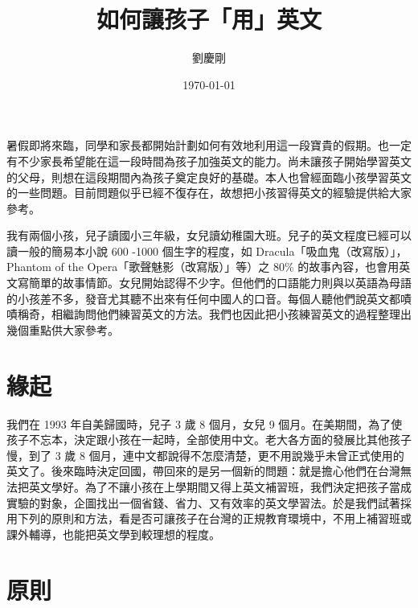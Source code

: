 
\title{ {\MB 如何讓孩子「用」英文}}	%
\author{{\SM 劉慶剛}}				%
\date{{\TT \today }} 			
 

\maketitle
\fontsize{12}{22pt}\selectfont 

暑假即將來臨，同學和家長都開始計劃如何有效地利用這一段寶貴的假期。也一定有不少家長希望能在這一段時間為孩子加強英文的能力。尚未讓孩子開始學習英文的父母，則想在這段期間內為孩子奠定良好的基礎。本人也曾經面臨小孩學習英文的一些問題。目前問題似乎已經不復存在，故想把小孩習得英文的經驗提供給大家參考。

我有兩個小孩，兒子讀國小三年級，女兒讀幼稚園大班。兒子的英文程度已經可以讀一般的簡易本小說 600 -1000 個生字的程度，如  Dracula「吸血鬼（改寫版）」，Phantom of the Opera「歌聲魅影（改寫版）」等）之 80\%  的故事內容，也會用英文寫簡單的故事情節。女兒開始認得不少字。但他們的口語能力則與以英語為母語的小孩差不多，發音尤其聽不出來有任何中國人的口音。每個人聽他們說英文都嘖嘖稱奇，相繼詢問他們練習英文的方法。我們也因此把小孩練習英文的過程整理出幾個重點供大家參考。


\section{緣起}
我們在 1993 年自美歸國時，兒子 3 歲 8 個月，女兒 9 個月。在美期間，為了使孩子不忘本，決定跟小孩在一起時，全部使用中文。老大各方面的發展比其他孩子慢，到了 3 歲 8 個月，連中文都說得不怎麼清楚，更不用說幾乎未曾正式使用的英文了。後來臨時決定回國，帶回來的是另一個新的問題：就是擔心他們在台灣無法把英文學好。為了不讓小孩在上學期間又得上英文補習班，我們決定把孩子當成實驗的對象，企圖找出一個省錢、省力、又有效率的英文學習法。於是我們試著採用下列的原則和方法，看是否可讓孩子在台灣的正規教育環境中，不用上補習班或課外輔導，也能把英文學到較理想的程度。

\section{原則}
